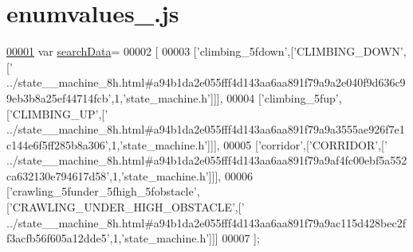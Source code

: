 \hypertarget{enumvalues__1_8js_source}{}\section{enumvalues\+\_.\+js}
\label{enumvalues__1_8js_source}

\begin{DoxyCode}
\hypertarget{enumvalues__1_8js_source.tex_l00001}{}\hyperlink{enumvalues__1_8js_ad01a7523f103d6242ef9b0451861231e}{00001} var \hyperlink{enumvalues__1_8js_ad01a7523f103d6242ef9b0451861231e}{searchData}=
00002 [
00003   [\textcolor{stringliteral}{'climbing\_5fdown'},[\textcolor{stringliteral}{'CLIMBING\_DOWN'},[\textcolor{stringliteral}{'
      ../state\_\_machine\_8h.html#a94b1da2e055fff4d143aa6aa891f79a9a2e040f9d636c99eb3b8a25ef44714fcb'},1,\textcolor{stringliteral}{'state\_machine.h'}]]],
00004   [\textcolor{stringliteral}{'climbing\_5fup'},[\textcolor{stringliteral}{'CLIMBING\_UP'},[\textcolor{stringliteral}{'
      ../state\_\_machine\_8h.html#a94b1da2e055fff4d143aa6aa891f79a9a3555ae926f7e1c144e6f5ff285b8a306'},1,\textcolor{stringliteral}{'state\_machine.h'}]]],
00005   [\textcolor{stringliteral}{'corridor'},[\textcolor{stringliteral}{'CORRIDOR'},[\textcolor{stringliteral}{'
      ../state\_\_machine\_8h.html#a94b1da2e055fff4d143aa6aa891f79a9af4fc00ebf5a552ca632130e794617d58'},1,\textcolor{stringliteral}{'state\_machine.h'}]]],
00006   [\textcolor{stringliteral}{'crawling\_5funder\_5fhigh\_5fobstacle'},[\textcolor{stringliteral}{'CRAWLING\_UNDER\_HIGH\_OBSTACLE'},[\textcolor{stringliteral}{'
      ../state\_\_machine\_8h.html#a94b1da2e055fff4d143aa6aa891f79a9ac115d428bec2ff3acfb56f605a12dde5'},1,\textcolor{stringliteral}{'state\_machine.h'}]]]
00007 ];
\end{DoxyCode}
